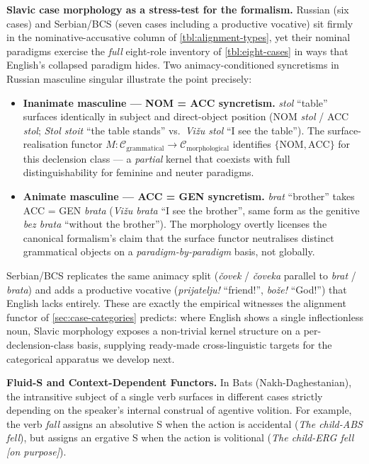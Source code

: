 \documentclass[
]{article}
\providecommand{\tightlist}{%
  \setlength{\itemsep}{0pt}\setlength{\parskip}{0pt}}
\begin{document}
\textbf{Slavic case morphology as a stress-test for the formalism.}
Russian (six cases) and Serbian/BCS (seven cases including a productive
vocative) sit firmly in the nominative-accusative column of
\autoref{tbl:alignment-types}, yet their nominal paradigms exercise the
\emph{full} eight-role inventory of \autoref{tbl:eight-cases} in ways
that English's collapsed paradigm hides. Two animacy-conditioned
syncretisms in Russian masculine singular illustrate the point
precisely:

\begin{itemize}
\tightlist
\item
  \textbf{Inanimate masculine --- NOM = ACC syncretism.} \emph{stol}
  ``table'' surfaces identically in subject and direct-object position
  (NOM \emph{stol} / ACC \emph{stol}; \emph{Stol stoit} ``the table
  stands'' vs.~\emph{Vižu stol} ``I see the table''). The
  surface-realisation functor
  \(M\colon\mathcal{C}_{\text{grammatical}} \to \mathcal{C}_{\text{morphological}}\)
  identifies \(\{\text{NOM},\text{ACC}\}\) for this declension class ---
  a \emph{partial} kernel that coexists with full distinguishability for
  feminine and neuter paradigms.
\item
  \textbf{Animate masculine --- ACC = GEN syncretism.} \emph{brat}
  ``brother'' takes ACC = GEN \emph{brata} (\emph{Vižu brata} ``I see
  the brother'', same form as the genitive \emph{bez brata} ``without
  the brother''). The morphology overtly licenses the canonical
  formalism's claim that the surface functor neutralises distinct
  grammatical objects on a \emph{paradigm-by-paradigm} basis, not
  globally.
\end{itemize}

Serbian/BCS replicates the same animacy split (\emph{čovek} /
\emph{čoveka} parallel to \emph{brat} / \emph{brata}) and adds a
productive vocative (\emph{prijatelju!} ``friend!'', \emph{bože!}
``God!'') that English lacks entirely. These are exactly the empirical
witnesses the alignment functor of \autoref{sec:case-categories}
predicts: where English shows a single inflectionless noun, Slavic
morphology exposes a non-trivial kernel structure on a
per-declension-class basis, supplying ready-made cross-linguistic
targets for the categorical apparatus we develop next.

\textbf{Fluid-S and Context-Dependent Functors.} In Bats
(Nakh-Daghestanian), the intransitive subject of a single verb surfaces
in different cases strictly depending on the speaker's internal
construal of agentive volition. For example, the verb \emph{fall}
assigns an absolutive S when the action is accidental (\emph{The
child-ABS fell}), but assigns an ergative S when the action is
volitional (\emph{The child-ERG fell {[}on purpose{]}}).
\end{document}
